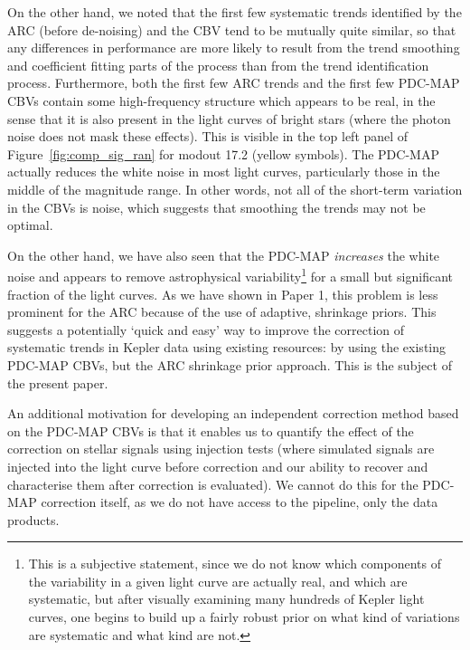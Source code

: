 \documentclass[useAMS,usenatbib]{mn2e}
\begin{document}
On the other hand, we noted that the first few systematic trends
identified by the ARC (before de-noising) and the CBV tend to be
mutually quite similar, so that any differences in performance are
more likely to result from the trend smoothing and coefficient fitting
parts of the process than from the trend identification
process. Furthermore, both the first few ARC trends and the first few
PDC-MAP CBVs contain some high-frequency structure which appears to be
real, in the sense that it is also present in the light curves of
bright stars (where the photon noise does not mask these effects).
This is visible in the top left panel of Figure~\ref{fig:comp_sig_ran}
for modout 17.2 (yellow symbols). The PDC-MAP actually reduces the
white noise in most light curves, particularly those in the middle of
the magnitude range. In other words, not all of the short-term
variation in the CBVs is noise, which suggests that smoothing the
trends may not be optimal.

On the other hand, we have also seen that the PDC-MAP \emph{increases}
the white noise and appears to remove astrophysical
variability\footnote{This is a subjective statement, since we do not
  know which components of the variability in a given light curve are
  actually real, and which are systematic, but after visually
  examining many hundreds of Kepler light curves, one begins to build
  up a fairly robust prior on what kind of variations are systematic
  and what kind are not.} for a small but significant fraction of the
light curves. As we have shown in Paper 1, this problem is less
prominent for the ARC because of the use of adaptive, shrinkage
priors. This suggests a potentially `quick and easy' way to improve
the correction of systematic trends in Kepler data using existing
resources: by using the existing PDC-MAP CBVs, but the ARC shrinkage
prior approach. This is the subject of the present paper. 

An
additional motivation for developing an independent correction method
based on the PDC-MAP CBVs is that it enables us to quantify the effect of
the correction on stellar signals using injection tests (where
simulated signals are injected into the light curve before correction
and our ability to recover and characterise them after correction is
evaluated). We cannot do this for the PDC-MAP correction itself, as we
do not have access to the pipeline, only the data products.

\smallskip
\end{document}
